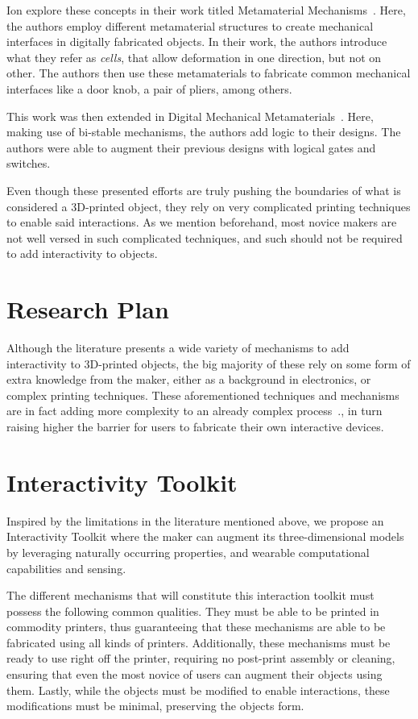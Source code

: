       Ion \etal explore these concepts in their work titled Metamaterial
      Mechanisms~\cite{Ion:2016kx}. Here, the authors employ different
      metamaterial structures to create mechanical interfaces in digitally
      fabricated objects. In their work, the authors introduce what they refer
      as \emph{cells}, that allow deformation in one direction, but not on
      other. The authors then use these metamaterials to fabricate common
      mechanical interfaces like a door knob, a pair of pliers, among others.
      
      This work was then extended in Digital Mechanical
      Metamaterials~\cite{Ion:2017bo}. Here, making use of bi-stable
      mechanisms, the authors add logic to their designs. The authors were able
      to augment their previous designs with logical gates and switches.

      Even though these presented efforts are truly pushing the boundaries of
      what is considered a 3D-printed object, they rely on very complicated
      printing techniques to enable said interactions. As we mention
      beforehand, most novice makers are not well versed in such complicated
      techniques, and such should not be required to add interactivity to
      objects.

  \section{Research Plan}
    Although the literature presents a wide variety of mechanisms to add
    interactivity to 3D-printed objects, the big majority of these rely on some
    form of extra knowledge from the maker, either as a background in
    electronics, or complex printing techniques. These
    aforementioned techniques and mechanisms are in fact adding more complexity
    to an already complex process~\cite{Hudson:2016hi, Mellis:2012ba,
    Weichel:2014ed}., in turn raising higher the barrier for users to fabricate
    their own interactive devices.

  \section{Interactivity Toolkit}
    Inspired by the limitations in the literature mentioned above, we propose
    an Interactivity Toolkit where the maker can augment its three-dimensional
    models by leveraging naturally occurring properties, and wearable computational capabilities and sensing.
    
    The different mechanisms that will constitute this interaction toolkit must
    possess the following common qualities. They must be able to be printed in
    commodity printers, thus guaranteeing that these mechanisms are able to be
    fabricated using all kinds of printers. Additionally, these mechanisms must
    be ready to use right off the printer, requiring no post-print assembly or
    cleaning, ensuring that even the most novice of users can augment their
    objects using them. Lastly, while the objects must be modified to enable
    interactions, these modifications must be minimal, preserving the objects
    form.
    
